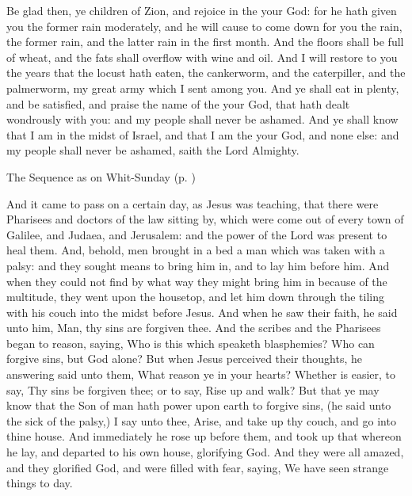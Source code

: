  Be glad then, ye children of Zion, and rejoice in the  your God: for he hath given you the former rain moderately, and he will cause to come down for you the rain, the former rain, and the latter rain in the first month. And the floors shall be full of wheat, and the fats shall overflow with wine and oil. And I will restore to you the years that the locust hath eaten, the cankerworm, and the caterpiller, and the palmerworm, my great army which I sent among you. And ye shall eat in plenty, and be satisfied, and praise the name of the  your God, that hath dealt wondrously with you: and my people shall never be ashamed. And ye shall know that I am in the midst of Israel, and that I am the  your God, and none else: and my people shall never be ashamed, saith the Lord Almighty.
\begin{rubric}
{The Sequence as on Whit-Sunday (p. \pageref{WhitSeq})}
\end{rubric}
 And it came to pass on a certain day, as Jesus was teaching, that there were Pharisees and doctors of the law sitting by, which were come out of every town of Galilee, and Judaea, and Jerusalem: and the power of the Lord was present to heal them. And, behold, men brought in a bed a man which was taken with a palsy: and they sought means to bring him in, and to lay him before him. And when they could not find by what way they might bring him in because of the multitude, they went upon the housetop, and let him down through the tiling with his couch into the midst before Jesus. And when he saw their faith, he said unto him, Man, thy sins are forgiven thee. And the scribes and the Pharisees began to reason, saying, Who is this which speaketh blasphemies? Who can forgive sins, but God alone? But when Jesus perceived their thoughts, he answering said unto them, What reason ye in your hearts? Whether is easier, to say, Thy sins be forgiven thee; or to say, Rise up and walk? But that ye may know that the Son of man hath power upon earth to forgive sins, (he said unto the sick of the palsy,) I say unto thee, Arise, and take up thy couch, and go into thine house. And immediately he rose up before them, and took up that whereon he lay, and departed to his own house, glorifying God. And they were all amazed, and they glorified God, and were filled with fear, saying, We have seen strange things to day.
